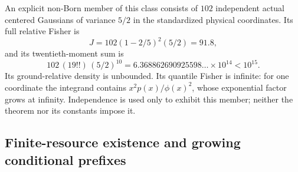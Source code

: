 \documentclass[11pt]{article}
\numberwithin{equation}{section}
\theoremstyle{definition}
\theoremstyle{remark}
\begin{document}
An explicit non-Born member of this class consists of $102$ independent
actual centered Gaussians of variance $5/2$ in the standardized physical
coordinates. Its full relative Fisher is
\[
 J=102(1-2/5)^2(5/2)=91.8,
\]
and its twentieth-moment sum is
\[
 102\,(19!!)\,(5/2)^{10}=6.368862690925598\ldots\times10^{14}<10^{15}.
\]
Its ground-relative density is unbounded. Its quantile Fisher is
infinite: for one coordinate the integrand contains
$x^2p(x)/\phi(x)^2$, whose exponential factor grows at infinity.
Independence is used only to exhibit this member; neither the theorem
nor its constants impose it.

\subsection{Finite-resource existence and growing conditional prefixes}
\end{document}

